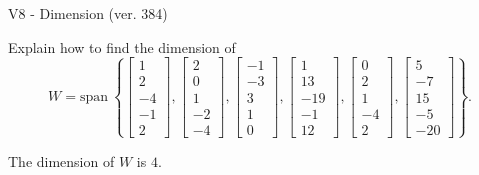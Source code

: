 \begin{exercise}
  \begin{exerciseTitle}V8 - Dimension (ver. 384)\end{exerciseTitle}
  \begin{exerciseStatement}
    Explain how to find the dimension of 
\[W=\mathrm{span}\ \left\{\left[\begin{array}{r}
1 \\
2 \\
-4 \\
-1 \\
2
\end{array}\right] , \left[\begin{array}{r}
2 \\
0 \\
1 \\
-2 \\
-4
\end{array}\right] , \left[\begin{array}{r}
-1 \\
-3 \\
3 \\
1 \\
0
\end{array}\right] , \left[\begin{array}{r}
1 \\
13 \\
-19 \\
-1 \\
12
\end{array}\right] , \left[\begin{array}{r}
0 \\
2 \\
1 \\
-4 \\
2
\end{array}\right] , \left[\begin{array}{r}
5 \\
-7 \\
15 \\
-5 \\
-20
\end{array}\right]\right\}.\]



  \end{exerciseStatement}
  \begin{exerciseAnswer}
   The dimension of \(W\) is  \(4\).
  


  \end{exerciseAnswer}
\end{exercise}